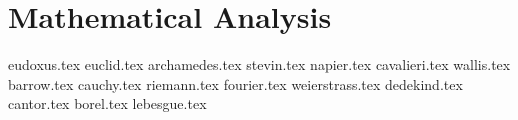 \documentclass{article}
\begin{document}
  \part{Mathematical Analysis}
  {eudoxus.tex}
  {euclid.tex}
  {archamedes.tex}
  {stevin.tex}
  {napier.tex}
  {cavalieri.tex}
  {wallis.tex}
  {barrow.tex}
  {cauchy.tex}
  {riemann.tex}
  {fourier.tex}
  {weierstrass.tex}
  {dedekind.tex}
  {cantor.tex}
  {borel.tex}
  {lebesgue.tex}


\end{document}
